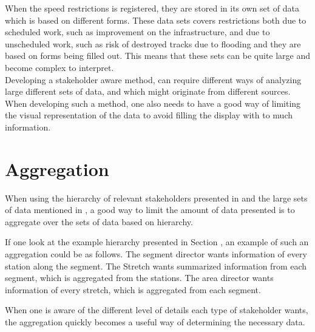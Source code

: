 When the speed restrictions is registered, they are stored in its own set of
data which is based on different forms. These data sets covers restrictions 
both due to scheduled work, such as improvement on the infrastructure, and due 
to unscheduled work, such as risk of destroyed tracks due to flooding and they 
are based on forms being filled out. This means that these sets can be quite 
large and become complex to interpret.\\

Developing a stakeholder aware method, can require different ways of analyzing
large different sets of data, and which might originate from different sources.
When developing such a method, one also needs to have a good way of limiting
the visual representation of the data to avoid filling the display with to much
information.

\section{Aggregation} %
\label{sec:back_aggregation}

When using the hierarchy of relevant stakeholders presented in 
and the large sets of data mentioned in , a
good way to limit the amount of data presented is to aggregate over the sets of
data based on hierarchy.

If one look at the example hierarchy presented in Section
, an example of such an aggregation could be as
follows. The segment director wants information of every station along the
segment. The Stretch wants summarized information from each segment, which is
aggregated from the stations. The area director wants information of every
stretch, which is aggregated from each segment.

When one is aware of the different level of details each type of stakeholder
wants, the aggregation quickly becomes a useful way of determining the
necessary data.

